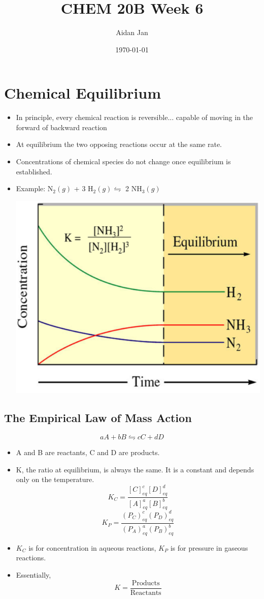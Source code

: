 \documentclass[10pt]{article}
\title{CHEM 20B Week 6}
\author{Aidan Jan}
\date{\today}
\begin{document}
\maketitle
\section*{Chemical Equilibrium}
\begin{itemize}
    \item In principle, every chemical reaction is reversible... capable of moving in the forward of backward reaction
    \item At equilibrium the two opposing reactions occur at the same rate.
    \item Concentrations of chemical species do not change once equilibrium is established.
    \item Example: N$_2(g)$ + 3 H$_2(g) \leftrightharpoons$ 2 NH$_3(g)$
    \begin{center}
        \includegraphics*[scale=0.8]{W6_1.png}
    \end{center}
\end{itemize}

\subsection*{The Empirical Law of Mass Action}
\[aA + bB \leftrightharpoons cC + dD\]
\begin{itemize}
    \item A and B are reactants, C and D are products.
    \item K, the ratio at equilibrium, is always the same.  It is a constant and depends only on the temperature.
    \[K_C = \frac{[C]_{eq}^c [D]_{eq}^d}{[A]_{eq}^a [B]_{eq}^b}\]
    \[K_P = \frac{(P_C)_{eq}^c (P_D)_{eq}^d}{(P_A)_{eq}^a (P_B)_{eq}^b}\]
    \item $K_C$ is for concentration in aqueous reactions, $K_P$ is for pressure in gaseous reactions.
    \item Essentially,
    \[K = \frac{\text{Products}}{\text{Reactants}}\]
\end{itemize}
\end{document}
